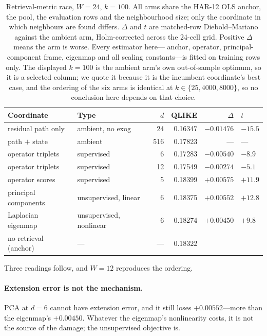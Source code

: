 \begin{table}[H]
\centering
\caption{Retrieval-metric race, $W = 24$, $k = 100$. All arms share the
HAR-12 OLS anchor, the pool, the evaluation rows and the neighbourhood size;
only the coordinate in which neighbours are found differs. $\Delta$ and $t$ are
matched-row Diebold--Mariano against the ambient arm, Holm-corrected across the
24-cell grid. Positive $\Delta$ means the arm is worse. Every estimator here---
anchor, operator, principal-component frame, eigenmap and all scaling
constants---is fitted on training rows only. The displayed $k = 100$ is the
ambient arm's own out-of-sample optimum, so it is a selected column; we quote
it because it is the incumbent coordinate's best case, and the ordering of the
six arms is identical at $k \in \{25, 4000, 8000\}$, so no conclusion here
depends on that choice.}
\label{tab:knn_metric_race}
\begin{tabular}{llrrrl}
\toprule
Coordinate & Type & $d$ & QLIKE & $\Delta$ & $t$ \\
\midrule
residual path only & ambient, no exog & 24 & 0.16347 & $-0.01476$ & $-15.5$ \\
path $+$ state & ambient & 516 & 0.17823 & --- & --- \\
operator triplets & supervised & 6 & 0.17283 & $-0.00540$ & $-8.9$ \\
operator triplets & supervised & 12 & 0.17549 & $-0.00274$ & $-5.1$ \\
operator scores & supervised & 5 & 0.18399 & $+0.00575$ & $+11.9$ \\
principal components & unsupervised, linear & 6 & 0.18375 & $+0.00552$ & $+12.8$ \\
Laplacian eigenmap & unsupervised, nonlinear & 6 & 0.18274 & $+0.00450$ & $+9.8$ \\
\midrule
no retrieval (anchor) & --- & --- & 0.18322 & & \\
\bottomrule
\end{tabular}
\end{table}

Three readings follow, and $W = 12$ reproduces the ordering.

\paragraph{Extension error is not the mechanism.} PCA at $d = 6$ cannot have
extension error, and it still loses $+0.00552$---more than the eigenmap's
$+0.00450$. Whatever the eigenmap's nonlinearity costs, it is not the source of
the damage; the unsupervised objective is.

